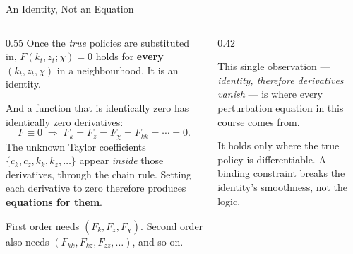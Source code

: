 \begin{frame}{An Identity, Not an Equation}
\begin{columns}[T]
\begin{column}{0.55\textwidth}
\small
Once the \emph{true} policies are substituted in, $F(k_t,z_t;\chi)=0$ holds for \textbf{every} $(k_t,z_t,\chi)$ in a neighbourhood. It is an identity.
\medskip

And a function that is identically zero has identically zero derivatives:
\[
  F\equiv 0 \;\Longrightarrow\; F_k=F_z=F_\chi=F_{kk}=\cdots=0 .
\]
\medskip
The unknown Taylor coefficients $\{c_k,c_z,k_k,k_z,\dots\}$ appear \emph{inside} those derivatives, through the chain rule. Setting each derivative to zero therefore produces \textbf{equations for them}.
\medskip

First order needs $(F_k,F_z,F_\chi)$. Second order also needs $(F_{kk},F_{kz},F_{zz},\dots)$, and so on.
\end{column}
\begin{column}{0.42\textwidth}
\begin{takeawaybox}\footnotesize
This single observation --- \emph{identity, therefore derivatives vanish} --- is where every perturbation equation in this course comes from.
\end{takeawaybox}
\medskip
\begin{cautionbox}\footnotesize
It holds only where the true policy is differentiable. A binding constraint breaks the identity's smoothness, not the logic.
\end{cautionbox}
\end{column}
\end{columns}
\vspace{1mm}
\end{frame}

